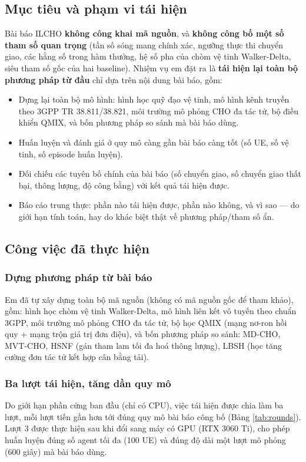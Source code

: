 \documentclass{article} %
\begin{document}
\subsection{Mục tiêu và phạm vi tái hiện}
Bài báo ILCHO \textbf{không công khai mã nguồn}, và \textbf{không công bố một số tham số quan trọng} (tần số sóng mang chính xác, ngưỡng thực thi chuyển giao, các hằng số trong hàm thưởng, hệ số pha của chòm vệ tinh Walker-Delta, siêu tham số gốc của hai baseline). Nhiệm vụ em đặt ra là \textbf{tái hiện lại toàn bộ phương pháp từ đầu} chỉ dựa trên nội dung bài báo, gồm:
\begin{itemize}
    \item Dựng lại toàn bộ mô hình: hình học quỹ đạo vệ tinh, mô hình kênh truyền theo 3GPP TR 38.811/38.821, môi trường mô phỏng CHO đa tác tử, bộ điều khiển QMIX, và bốn phương pháp so sánh mà bài báo dùng.
    \item Huấn luyện và đánh giá ở quy mô càng gần bài báo càng tốt (số UE, số vệ tinh, số episode huấn luyện).
    \item Đối chiếu các tuyên bố chính của bài báo (số chuyển giao, số chuyển giao thất bại, thông lượng, độ công bằng) với kết quả tái hiện được.
    \item Báo cáo trung thực: phần nào tái hiện được, phần nào không, và vì sao — do giới hạn tính toán, hay do khác biệt thật về phương pháp/tham số ẩn.
\end{itemize}

\subsection{Công việc đã thực hiện}
\subsubsection{Dựng phương pháp từ bài báo}
Em đã tự xây dựng toàn bộ mã nguồn (không có mã nguồn gốc để tham khảo), gồm: hình học chòm vệ tinh Walker-Delta, mô hình liên kết vô tuyến theo chuẩn 3GPP, môi trường mô phỏng CHO đa tác tử, bộ học QMIX (mạng nơ-ron hồi quy + mạng trộn giá trị đơn điệu), và bốn phương pháp so sánh: MD-CHO, MVT-CHO, HSNF (gán tham lam tối đa hoá thông lượng), LBSH (học tăng cường đơn tác tử kết hợp cân bằng tải).

\subsubsection{Ba lượt tái hiện, tăng dần quy mô}
Do giới hạn phần cứng ban đầu (chỉ có CPU), việc tái hiện được chia làm ba lượt, mỗi lượt tiến gần hơn tới đúng quy mô bài báo công bố (Bảng \ref{tab:rounds}). Lượt 3 được thực hiện sau khi đổi sang máy có GPU (RTX 3060 Ti), cho phép huấn luyện đúng số agent tối đa (100 UE) và đúng độ dài một lượt mô phỏng (600 giây) mà bài báo dùng.
\end{document}
